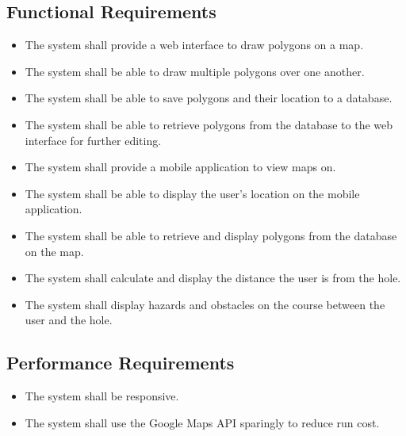 \documentclass{article}
\begin{document}
    \subsection{Functional Requirements}
    \begin{itemize}
        \item
            The system shall provide a web interface to draw polygons on a map.
        \item
            The system shall be able to draw multiple polygons over one another.
        \item
            The system shall be able to save polygons and their location to a
            database.
        \item
            The system shall be able to retrieve polygons from the database to
            the web interface for further editing.
        \item
            The system shall provide a mobile application to view maps on.
        \item
            The system shall be able to display the user's location on the
            mobile application.
        \item
            The system shall be able to retrieve and display polygons from the
            database on the map.
        \item
            The system shall calculate and display the distance the user is from
            the hole.
        \item
            The system shall display hazards and obstacles on the course between
            the user and the hole.
    \end{itemize}

    \subsection{Performance Requirements}
    \begin{itemize}
        \item
            The system shall be responsive.
        \item
            The system shall use the Google Maps API sparingly to reduce run
            cost.
    \end{itemize}
\end{document}
